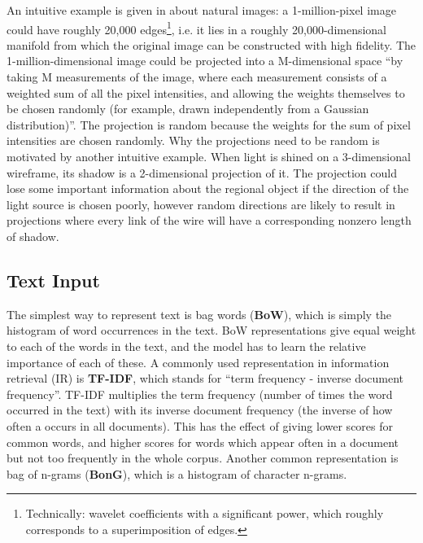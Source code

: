 An intuitive example is given in \cite{compressive_sensing3} about natural images: a 1-million-pixel image could have roughly 20,000 edges\footnote{Technically: wavelet coefficients with a significant power, which roughly corresponds to a superimposition of edges.}, i.e. it lies in a roughly 20,000-dimensional manifold from which the original image can be constructed with high fidelity.
The 1-million-dimensional image could be projected into a M-dimensional space ``by taking M measurements of the image, where each measurement consists of a weighted sum of all the pixel intensities, and allowing the weights themselves to be chosen randomly (for example, drawn independently from a Gaussian distribution)''\cite{compressive_sensing3}.
The projection is random because the weights for the sum of pixel intensities are chosen randomly.
Why the projections need to be random is motivated by another intuitive example.
When light is shined on a 3-dimensional wireframe, its shadow is a 2-dimensional projection of it.
The projection could lose some important information about the regional object if the direction of the light source is chosen poorly,  however random directions are likely to result in projections where every link of the wire will have a corresponding nonzero length of shadow.

\subsection{Text Input}

The simplest way to represent  text is bag words (\textbf{BoW}),  which  is simply the histogram of word occurrences  in the text.
BoW  representations give equal weight to each of the words in the text, and the model has to learn the relative importance of each of these.
A commonly used representation in information retrieval (IR) is \textbf{TF-IDF},  which stands for ``term frequency -  inverse document frequency''.
TF-IDF  multiplies the term frequency (number of times the word occurred in the text) with its inverse document frequency (the inverse of how often a occurs in all documents).
This has the effect of giving lower scores for common words, and higher scores for words which appear often in a document but not too frequently in the whole corpus.
Another common representation is bag of n-grams (\textbf{BonG}), which  is a histogram of character n-grams.

